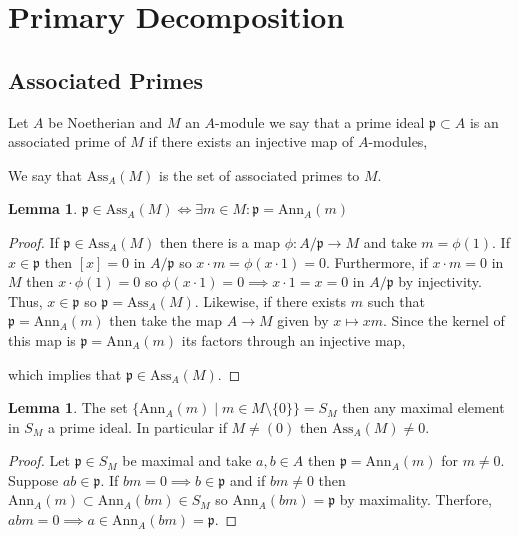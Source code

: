 \documentclass[12pt]{article}
\newcommand{\Ann}[2]{\mathrm{Ann}_{#1}\left(#2\right)}
\newcommand{\Ass}[2]{\mathrm{Ass}_{#1}\left( #2 \right)}
\newcommand{\p}{\mathfrak{p}}
\theoremstyle{remark}
\theoremstyle{definition}
\newtheorem{lemma}[theorem]{Lemma}
\newenvironment{definition}[1][Definition:]{\begin{trivlist}
\item[\hskip \labelsep {\bfseries #1}]}{\end{trivlist}}
\begin{document}
\section{Primary Decomposition}

\subsection{Associated Primes}


\begin{definition}
Let $A$ be Noetherian and $M$ an $A$-module we say that a prime ideal $\p \subset A$ is an associated prime of $M$ if there exists an injective map of $A$-modules,
\begin{center}
\end{center}
We say that $\Ass{A}{M}$ is the set of associated primes to $M$. 
\end{definition}

\begin{lemma}
$\p \in \Ass{A}{M} \iff \exists m \in M : \p = \Ann{A}{m}$
\end{lemma}

\begin{proof}
If $\p \in \Ass{A}{M}$ then there is a map $\phi : A /\p \to M$ and take $m = \phi(1)$. If $x \in \p$ then $[x] = 0$ in $A / \p$ so $x \cdot m = \phi(x \cdot 1) = 0$. Furthermore, if $x \cdot m = 0$ in $M$ then $x \cdot \phi(1) = 0$ so $\phi(x \cdot 1) = 0 \implies x \cdot 1 = x = 0$ in $A / \p$ by injectivity. Thus, $x \in \p$ so $\p = \Ass{A}{M}$. Likewise, if there exists $m$ such that $\p = \Ann{A}{m}$ then take the map $A \to M$ given by $x \mapsto xm$. Since the kernel of this map is $\p = \Ann{A}{m}$ its factors through an injective map,
\begin{center}
\end{center}
which implies that $\p \in \Ass{A}{M}$.
\end{proof}


\begin{lemma}
The set $\{ \Ann{A}{m} \mid m \in M \setminus \{0\} \} = S_M$ then any maximal element in $S_M$ a prime ideal. In particular if $M \neq (0)$ then $\Ass{A}{M} \neq 0$.
\end{lemma}

\begin{proof}
Let $\p \in S_M$ be maximal and take $a,b \in A$ then $\p = \Ann{A}{m}$ for $m \neq 0$. Suppose $ab \in \p$. If $b m = 0 \implies b \in \p$ and if $b m \neq 0$ then $\Ann{A}{m} \subset \Ann{A}{bm} \in S_M$ so $\Ann{A}{bm} = \p$ by maximality. Therfore, $a b m = 0 \implies a \in \Ann{A}{bm} = \p$. 
\end{proof}
\end{document}
